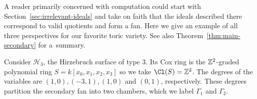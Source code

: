 \documentclass{article}
\begin{document}
A reader primarily concerned with computation could start with Section~\ref{sec:irrelevant-ideals} and take on faith that the ideals described there correspond to valid quotients and form a fan.  Here we give an example of all three perspectives for our favorite toric variety.  See also Theorem~\ref{thm:main-secondary} for a~summary.

\begin{example}\label{ex:hirzsecondary}
Consider $\mathcal H_3$, the Hirzebruch surface of type $3$.  Its Cox ring is the $\mathbb Z^2$-graded polynomial ring $S=k[x_0,x_1,x_2,x_3]$ so we take $\Cl(S)=\ZZ^2$.  The degrees of the variables are $(1,0), (-3,1), (1,0)$ and $(0,1)$, respectively.  These degrees partition the secondary fan into two chambers, which we label $\Gamma_1$ and $\Gamma_2$.

  \begin{center}
\end{center}
\end{example}
\end{document}
